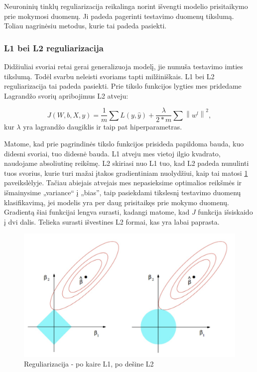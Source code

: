 \documentclass[a4paper, 12pt]{article}
\begin{document}
Neuroninių tinklų reguliarizacija reikalinga norint išvengti modelio prisitaikymo prie mokymosi duomenų. Ji padeda pagerinti testavimo duomenų tikslumą. Toliau nagrinėsiu metodus, kurie tai padeda pasiekti.

%
\subsubsection{L1 bei L2 reguliarizacija}
%

Didžiuliai svoriai retai gerai generalizuoja modelį, jie numuša testavimo imties tikslumą. Todėl svarbu neleisti svoriams tapti milžiniškais. L1 bei L2 reguliarizacija tai padeda pasiekti. Prie tikslo funkcijos lygties mes pridedame Lagrandžo svorių apribojimus L2 atveju:

$$
J(W, b, X, y)=\frac{1}{m} \sum L(y, \hat{y})+\frac{\lambda}{2 * m} \sum\left\|w^{l}\right\|^{2},
$$
kur $\lambda$ yra lagrandžo daugiklis ir taip pat hiperparametras.

Matome, kad prie pagrindinės tikslo funkcijos prisideda papildoma bauda, kuo didesni svoriai, tuo didesnė bauda. L1 atveju mes vietoj ilgio kvadrato, naudojame absoliutinę reikšmę. L2 skiriasi nuo L1 tuo, kad L2 padeda nunulinti tuos svorius, kurie turi mažai įtakos gradientiniam nuolydžiui, kaip tai matosi \ref{regularization} paveikslėlyje. Tačiau abiejais atvejais mes nepasieksime optimalios reikšmės ir išmainysime „variance“ į „bias”, taip pasiekdami tikslesnį testavimo duomenų klasifikavimą, jei modelis yra per daug prisitaikęs prie mokymo duomenų.
Gradientą šiai funkcijai lengva surasti, kadangi matome, kad $J$ funkcija išsiskaido į dvi dalis. Telieka surasti išvestines L2 formai, kas yra labai paprasta.

\begin{figure}[h]
\centering
\includegraphics[width=1\textwidth]{regularization}
\caption{Reguliarizacija - po kaire L1, po dešine L2}
\label{regularization}
\end{figure}
\end{document}

